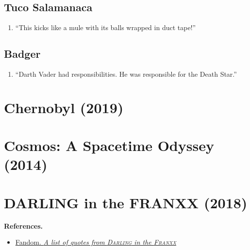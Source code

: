 \documentclass{book}
\numberwithin{equation}{section}
\begin{document}
\section{Tuco Salamanaca}
\begin{enumerate}
    \item ``This kicks like a mule with its balls wrapped in duct tape!''
\end{enumerate}

\section{Badger}
\begin{enumerate}
    \item ``Darth Vader had responsibilities. He was responsible for the Death Star.''
\end{enumerate}


\chapter{Chernobyl (2019)}


\chapter{Cosmos: A Spacetime Odyssey (2014)}


\chapter{DARLING in the FRANXX (2018)}

\textbf{References.}
\begin{itemize}
    \item \href{https://darling-in-the-franxx.fandom.com/wiki/List_of_Quotes}{Fandom. \textit{A list of quotes from \textsc{Darling} in the \textsc{Franxx}}}
\end{itemize}
\end{document}
